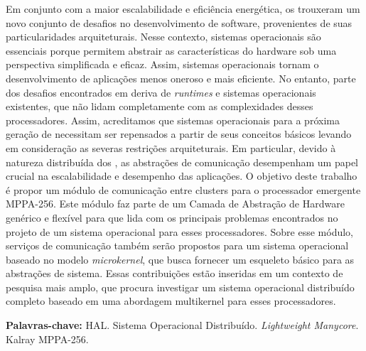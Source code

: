 
\begin{resumo}[Resumo]
	Em conjunto com a maior escalabilidade e eficiência energética,
	os \lightweight \manycores trouxeram um novo conjunto de desafios no
	desenvolvimento de software, provenientes de suas particularidades arquiteturais.
	Nesse contexto, sistemas operacionais são essenciais porque permitem abstrair
	as características do hardware sob uma perspectiva simplificada e eficaz.
	Assim, sistemas operacionais tornam o desenvolvimento de aplicações
	menos oneroso e mais eficiente.
	No entanto, parte dos desafios encontrados em \lightweight \manycores
	deriva de \textit{runtimes} e sistemas operacionais existentes, que não
	lidam completamente com as complexidades desses processadores.
	Assim, acreditamos que sistemas operacionais para a próxima geração de
	\lightweight \manycores necessitam ser repensados a partir de seus conceitos
	básicos levando em consideração as severas restrições arquiteturais.
	Em particular, devido à natureza distribuída dos \manycores, as
	abstrações de comunicação desempenham um papel crucial na escalabilidade
	e desempenho das aplicações.
	O objetivo deste trabalho é propor um módulo de comunicação
	entre clusters para o processador \manycore emergente MPPA-256.
	Este módulo faz parte de um Camada de Abstração de Hardware genérico e
	flexível para \lightweight \manycores que lida com os principais
	problemas encontrados no projeto de um sistema operacional para esses processadores.
	Sobre esse módulo, serviços de comunicação também serão propostos para
	um sistema operacional baseado no modelo \textit{microkernel}, que busca
	fornecer um esqueleto básico para as abstrações de sistema.
	Essas contribuições estão inseridas em um contexto de pesquisa mais amplo,
	que procura investigar um sistema operacional distribuído completo baseado
	em uma abordagem multikernel para esses processadores.

	\vspace{\baselineskip}
	\textbf{Palavras-chave:} HAL. Sistema Operacional Distribuído. \textit{Lightweight Manycore}. Kalray MPPA-256.
\end{resumo}


